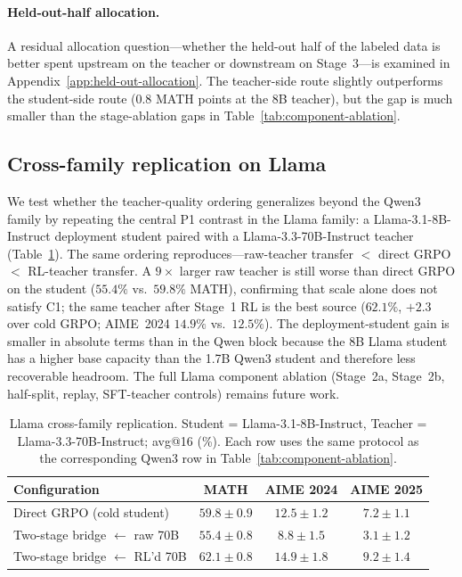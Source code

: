 \documentclass{article}
\begin{document}
\paragraph{Held-out-half allocation.} A residual allocation question---whether the held-out half of the labeled data is better spent upstream on the teacher or downstream on Stage~3---is examined in Appendix~\ref{app:held-out-allocation}. The teacher-side route slightly outperforms the student-side route ($0.8$ MATH points at the 8B teacher), but the gap is much smaller than the stage-ablation gaps in Table~\ref{tab:component-ablation}.

\subsection{Cross-family replication on Llama}
\label{sec:exp-llama}

We test whether the teacher-quality ordering generalizes beyond the Qwen3 family by repeating the central P1 contrast in the Llama family: a Llama-3.1-8B-Instruct deployment student paired with a Llama-3.3-70B-Instruct teacher (Table~\ref{tab:llama-transfer}). The same ordering reproduces---raw-teacher transfer $<$ direct GRPO $<$ RL-teacher transfer. A $9\times$ larger raw teacher is still worse than direct GRPO on the student ($55.4\%$ vs.\ $59.8\%$ MATH), confirming that scale alone does not satisfy C1; the same teacher after Stage~1 RL is the best source ($62.1\%$, $+2.3$ over cold GRPO; AIME~2024 $14.9\%$ vs.\ $12.5\%$). The deployment-student gain is smaller in absolute terms than in the Qwen block because the 8B Llama student has a higher base capacity than the 1.7B Qwen3 student and therefore less recoverable headroom. The full Llama component ablation (Stage~2a, Stage~2b, half-split, replay, SFT-teacher controls) remains future work.

\begin{table}[t]
\caption{Llama cross-family replication. Student = Llama-3.1-8B-Instruct, Teacher = Llama-3.3-70B-Instruct; avg@16 (\%). Each row uses the same protocol as the corresponding Qwen3 row in Table~\ref{tab:component-ablation}.}
\label{tab:llama-transfer}
\centering
\small
\begin{tabular}{lccc}
\toprule
Configuration & MATH & AIME 2024 & AIME 2025 \\
\midrule
Direct GRPO (cold student)            & $59.8 \pm 0.9$ & $12.5 \pm 1.2$ & $7.2 \pm 1.1$ \\
Two-stage bridge $\leftarrow$ raw 70B & $55.4 \pm 0.8$ & $8.8 \pm 1.5$  & $3.1 \pm 1.2$ \\
Two-stage bridge $\leftarrow$ RL'd 70B & $\mathbf{62.1 \pm 0.8}$ & $\mathbf{14.9 \pm 1.8}$ & $\mathbf{9.2 \pm 1.4}$ \\
\bottomrule
\end{tabular}
\end{table}
\end{document}
